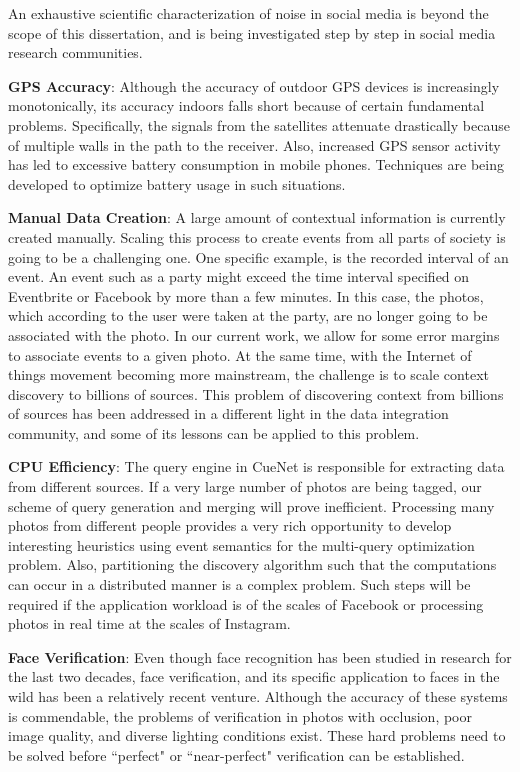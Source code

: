 An exhaustive scientific characterization of noise in social media is beyond the scope of this dissertation, and is being investigated step by step in social media research communities.

\textbf{\textbf{GPS Accuracy}}: Although the accuracy of outdoor GPS devices is increasingly monotonically, its accuracy indoors falls short because of certain fundamental problems. Specifically, the signals from the satellites attenuate drastically because of multiple walls in the path to the receiver. Also, increased GPS sensor activity has led to excessive battery consumption in mobile phones. Techniques are being developed to optimize battery usage in such situations.

\textbf{\textbf{Manual Data Creation}}: A large amount of contextual information is currently created manually. Scaling this process to create events from all parts of society is going to be a challenging one. One specific example, is the recorded interval of an event. An event such as a party might exceed the time interval specified on Eventbrite or Facebook by more than a few minutes. In this case, the photos, which according to the user were taken at the party, are no longer going to be associated with the photo. In our current work, we allow for some error margins to associate events to a given photo. At the same time, with the Internet of things movement becoming more mainstream, the challenge is to scale context discovery to billions of sources. This problem of discovering context from billions of sources has been addressed in a different light in the data integration community, and some of its lessons can be applied to this problem.

\textbf{\textbf{CPU Efficiency}}: The query engine in CueNet is responsible for extracting data from different sources. If a very large number of photos are being tagged, our scheme of query generation and merging will prove inefficient. Processing many photos from different people provides a very rich opportunity to develop interesting heuristics using event semantics for the multi-query optimization problem. Also, partitioning the discovery algorithm such that the computations can occur in a distributed manner is a complex problem. Such steps will be required if the application workload is of the scales of Facebook or processing photos in real time at the scales of Instagram.

\textbf{\textbf{Face Verification}}: Even though face recognition has been studied in research for the last two decades, face verification, and its specific application to faces in the wild has been a relatively recent venture. Although the accuracy of these systems is commendable, the problems of verification in photos with occlusion, poor image quality, and diverse lighting conditions exist. These hard problems need to be solved before ``perfect" or ``near-perfect" verification can be established. 

